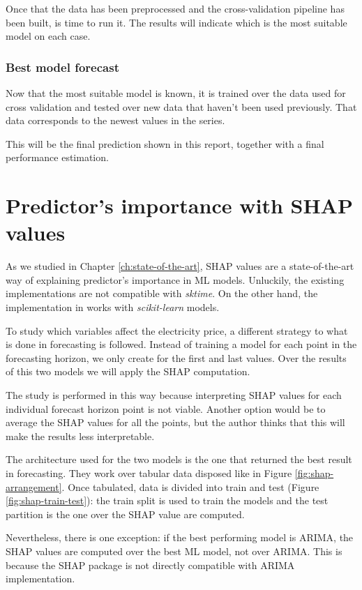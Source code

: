 Once that the data has been preprocessed and the cross-validation pipeline has been built, is time to run it.
The results will indicate which is the most suitable model on each case.

\subsubsection{Best model forecast}
Now that the most suitable model is known, it is trained over the data used for cross validation and tested  over new data that haven't been used previously.
That data corresponds to the newest values in the series.

This will be the final prediction shown in this report, together with a final performance estimation.

\section{Predictor's importance with SHAP values}
As we studied in Chapter \ref{ch:state-of-the-art}, SHAP values are a state-of-the-art way of explaining predictor's importance in ML models. Unluckily, the existing implementations are not compatible with \textit{sktime}. On the other hand, the implementation in \cite{shap-package} works with \textit{scikit-learn} models.

To study which variables affect the electricity price, a different strategy to what is done in forecasting is followed. Instead of training a model for each point in the forecasting horizon, we only create for the first and last values. Over the results of this two models we will apply the SHAP computation.

The study is performed in this way because interpreting SHAP values for each individual forecast horizon point is not viable. Another option would be to average the SHAP values for all the points, but the author thinks that this will make the results less interpretable.

The architecture used for the two models is the one that returned the best result in forecasting. They work over tabular data disposed like in Figure \ref{fig:shap-arrangement}. Once tabulated, data is divided into train and test (Figure \ref{fig:shap-train-test}): the train split is used to train the models and the test partition is the one over the SHAP value are computed.

Nevertheless, there is one exception: if the best performing model is ARIMA, the SHAP values are computed over the best ML model, not over ARIMA. This is because the SHAP package is not directly compatible with ARIMA implementation.

